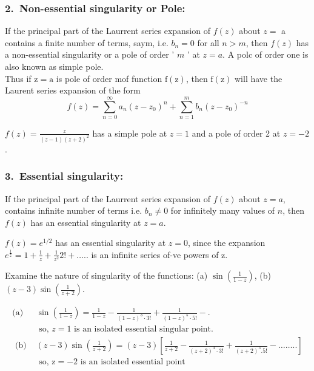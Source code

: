 \subsubsection{2.\ Non-essential singularity or Pole:} If the principal part of the Laurrent series expansion of $f(z)$ about $z=$ a contains a finite number of terms, saym, i.e. $b_{n}=0$ for all $n>m$, then $f(z)$ has a non-essential singularity or a pole of order ' $m$ ' at $z=a$. A polc of order one is also known as simple pole.\\
Thus if $\mathrm{z}=\mathrm{a}$ is pole of order mof function $\mathrm{f}(\mathrm{z})$, then $\mathrm{f}(\mathrm{z})$ will have the Laurent series expansion of the form
$$
f(z)=\sum_{n=0}^{\infty} a_{n}\left(z-z_{0}\right)^{n}+\sum_{n=1}^{m} b_{n}\left(z-z_{0}\right)^{-n}
$$
\begin{example}
	$f(z)=\frac{z}{(z-1)(z+2)^{2}}$ has a simple pole at $z=1$ and a pole of order 2 at $z=-2$.
\end{example} 
\subsubsection{3.\ Essential singularity: }If the principal part of the Laurrent series expansion of $f(z)$ about $z=a$, contains infinite number of terms i.e. $b_{n} \neq 0$ for infinitely many values of $n$, then $f(z)$ has an essential singularity at $z=a$.\\
\begin{example}
	$f(z)=e^{1 / 2}$ has an essential singularity at $z=0$, since the expansion $e^{\frac{1}{z}}=1+\frac{1}{z}+\frac{1}{z^{2}} 2 !+\ldots . .$ is an infinite series of-ve powers of $\mathrm{z}$.
\end{example} 
\begin{exercise}
	Examine the nature of singularity of the functions: (a) $\sin \left(\frac{1}{1-z}\right)$, (b) $(z-3) \sin \left(\frac{1}{z+2}\right)$.
\end{exercise}
\begin{answer}
	\begin{align*}
	\text{(a) }&\sin \left(\frac{1}{1-z}\right)=\frac{1}{1-z}-\frac{1}{(1-z)^{3} \cdot 3 !}+\frac{1}{(1-z)^{5} \cdot 5 !}-.\\
&\text{	so, $z=1$ is an isolated essential singular point.}\\
\text { (b) }&(z-3) \sin \left(\frac{1}{z+2}\right)=(z-3)\left[\frac{1}{z+2}-\frac{1}{(z+2)^{3} \cdot 3 !}+\frac{1}{(z+2)^{5} .5 !}-\ldots \ldots . .\right] \\ &\text { so, $\mathrm{z}=-2$  is an isolated essential point}
	\end{align*}
\end{answer}
